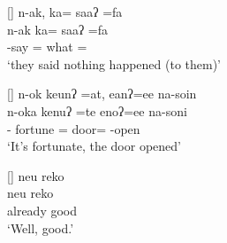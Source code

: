 \begin{exe}
{\begin{xlist}
\end{xlist}}

\vspace{-4pt}
[]{\glll
	n-ak, ka= saaʔ =fa\\
	n-ak ka= saaʔ =fa \\
	\n-say {\ka}= what ={\fa} \\
\glt `they said nothing happened (to them)'}

\vspace{-4pt}
[]{\glll
	n-ok keunʔ =at, eanʔ=ee na-soin \\
	n-oka kenuʔ =te enoʔ=ee na-soni \\
	{\n-\ok} fortune ={\te} door={\ee} \na-open \\
\glt `It's fortunate, the door opened'}

[]{\glll
	neu reko\\
	neu reko \\
	already good \\
\glt `Well, good.'}

\end{exe}